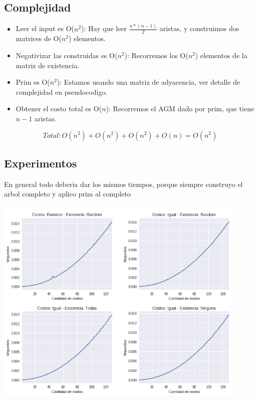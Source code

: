 \subsection{Complejidad}

\begin{itemize}
	\item Leer el input es O($n^2$): Hay que leer $\frac{n*(n-1)}{2}$ aristas, y construimos dos matrices de O($n^2$) elementos.
	\item Negativizar las construidas es O($n^2$): Recorremos los O($n^2$) elementos de la matriz de existencia.
	\item Prim es O($n^2$): Estamos usando una matriz de adyacencia, ver detalle de complejidad en pseudocodigo.
	\item Obtener el costo total es O($n$): Recorremos el AGM dado por prim, que tiene $n-1$ aristas.
\end{itemize}

$$Total:  O(n^2) + O(n^2) + O(n^2) + O(n) = O(n^2) $$

\subsection{Experimentos}

En general todo deberia dar los mismos tiempos, porque siempre construyo el arbol completo y aplico prim al completo


{\centering
  \includegraphics[width=0.9\textwidth]{imagenes/problema3/todos.png} \\
}
